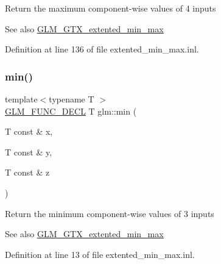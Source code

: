 Return the maximum component-\/wise values of 4 inputs \begin{DoxySeeAlso}{See also}
\hyperlink{group__gtx__extented__min__max}{G\+L\+M\+\_\+\+G\+T\+X\+\_\+extented\+\_\+min\+\_\+max} 
\end{DoxySeeAlso}


Definition at line 136 of file extented\+\_\+min\+\_\+max.\+inl.

\mbox{\label{group__gtx__extented__min__max_ga713d3f9b3e76312c0d314e0c8611a6a6}} 
\subsubsection{\texorpdfstring{min()}{min()}\hspace{0.1cm}{\footnotesize\ttfamily [1/6]}}
{\footnotesize\ttfamily template$<$typename T $>$ \\
\hyperlink{setup_8hpp_ab2d052de21a70539923e9bcbf6e83a51}{G\+L\+M\+\_\+\+F\+U\+N\+C\+\_\+\+D\+E\+CL} T glm\+::min (\begin{DoxyParamCaption}\item[{T const \&}]{x,  }\item[{T const \&}]{y,  }\item[{T const \&}]{z }\end{DoxyParamCaption})}

Return the minimum component-\/wise values of 3 inputs \begin{DoxySeeAlso}{See also}
\hyperlink{group__gtx__extented__min__max}{G\+L\+M\+\_\+\+G\+T\+X\+\_\+extented\+\_\+min\+\_\+max} 
\end{DoxySeeAlso}


Definition at line 13 of file extented\+\_\+min\+\_\+max.\+inl.

\mbox{\label{group__gtx__extented__min__max_ga74d1a96e7cdbac40f6d35142d3bcbbd4}} 

